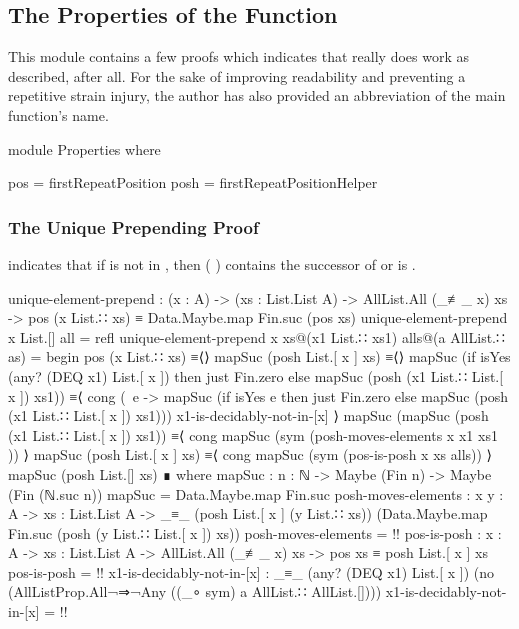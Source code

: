\documentclass{report}
\begin{document}
\subsection{The Properties of the Function}
This module contains a few proofs which indicates that  really does work as described, after all.  For the sake of improving readability and preventing a repetitive strain injury, the author has also provided an abbreviation of the main function's name.

\begin{code}
  module Properties where

    pos = firstRepeatPosition
    posh = firstRepeatPositionHelper
\end{code}

\subsubsection{The Unique Prepending Proof}
 indicates that if  is not in , then  \AgdaSymbol(  \AgdaSymbol) contains the successor of   or is .

\begin{code}
    unique-element-prepend :
      (x : A) ->
      (xs : List.List A) ->
      AllList.All (_≢_ x) xs ->
      pos (x List.∷ xs) ≡ Data.Maybe.map Fin.suc (pos xs)
    unique-element-prepend x List.[] all = refl
    unique-element-prepend x xs@(x1 List.∷ xs1) alls@(a AllList.∷ as) = begin
      pos (x List.∷ xs)
        ≡⟨⟩
      mapSuc (posh List.[ x ] xs)
        ≡⟨⟩
      mapSuc
        (if isYes (any? (DEQ x1) List.[ x ])
            then just Fin.zero
            else mapSuc (posh (x1 List.∷ List.[ x ]) xs1))
        ≡⟨ cong (\ e -> mapSuc (if isYes e
                                   then just Fin.zero
                                   else mapSuc (posh (x1 List.∷ List.[ x ]) xs1)))
                x1-is-decidably-not-in-[x] ⟩
      mapSuc (mapSuc (posh (x1 List.∷ List.[ x ]) xs1))
        ≡⟨ cong mapSuc (sym (posh-moves-elements {x} {x1} {xs1} )) ⟩
      mapSuc (posh List.[ x ] xs)
        ≡⟨ cong mapSuc (sym (pos-is-posh {x} {xs} alls)) ⟩
      mapSuc (posh List.[] xs) ∎
      where
      mapSuc : {n : ℕ} -> Maybe (Fin n) -> Maybe (Fin (ℕ.suc n))
      mapSuc = Data.Maybe.map Fin.suc
      posh-moves-elements :
        {x y : A} ->
        {xs : List.List A} ->
        _≡_ (posh List.[ x ] (y List.∷ xs))
            (Data.Maybe.map Fin.suc (posh (y List.∷ List.[ x ]) xs))
      posh-moves-elements = {!!}
      pos-is-posh :
        {x : A} ->
        {xs : List.List A} ->
        AllList.All (_≢_ x) xs ->
        pos xs ≡ posh List.[ x ] xs
      pos-is-posh = {!!}
      x1-is-decidably-not-in-[x] :
        _≡_ (any? (DEQ x1) List.[ x ])
            (no (AllListProp.All¬⇒¬Any ((_∘ sym) a AllList.∷ AllList.[])))
      x1-is-decidably-not-in-[x] = {!!}
\end{code}
\end{document}

